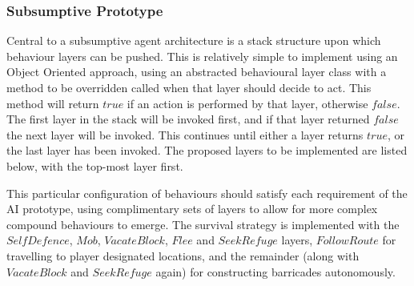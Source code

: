 \documentclass[12pt,a4paper]{article}
\begin{document}
\subsubsection{Subsumptive Prototype}\noindent
Central to a subsumptive agent architecture is a stack structure upon which behaviour layers can be pushed. This is relatively simple to implement using an Object Oriented approach, using an abstracted behavioural layer class with a method to be overridden called when that layer should decide to act. This method will return $true$ if an action is performed by that layer, otherwise $false$. The first layer in the stack will be invoked first, and if that layer returned $false$ the next layer will be invoked. This continues until either a layer returns $true$, or the last layer has been invoked. The proposed layers to be implemented are listed below, with the top-most layer first.

\noindent
\begin{itemize}
\end{itemize}

This particular configuration of behaviours should satisfy each requirement of the AI prototype, using complimentary sets of layers to allow for more complex compound behaviours to emerge. The survival strategy is implemented with the $SelfDefence$, $Mob$, $VacateBlock$, $Flee$ and $SeekRefuge$ layers, $FollowRoute$ for travelling to player designated locations, and the remainder (along with $VacateBlock$ and $SeekRefuge$ again) for constructing barricades autonomously.
\end{document}

